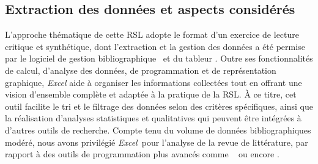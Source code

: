 \begin{refsegment}
\subsection{Extraction des données et aspects considérés
    \label{chap2:extraction-donnees-aspects-consideres}
    }
    
L'approche thématique de cette \acrshort{RSL} adopte le format d'un exercice de lecture critique et synthétique, dont l'extraction et la gestion des données a été permise par le logiciel de gestion bibliographique ~et du tableur . Outre ses fonctionnalités de calcul, d'analyse des données, de programmation et de représentation graphique, \textsl{Excel} aide à organiser les informations collectées tout en offrant une vision d'ensemble complète et adaptée à la pratique de la \acrshort{RSL}. À ce titre, cet outil facilite le tri et le filtrage des données selon des critères spécifiques, ainsi que la réalisation d'analyses statistiques et qualitatives qui peuvent être intégrées à d'autres outils de recherche. Compte tenu du volume de données bibliographiques modéré, nous avons privilégié \textsl{Excel}~pour l'analyse de la revue de littérature, par rapport à des outils de programmation plus avancés comme ~ ou encore .%



\end{refsegment}
